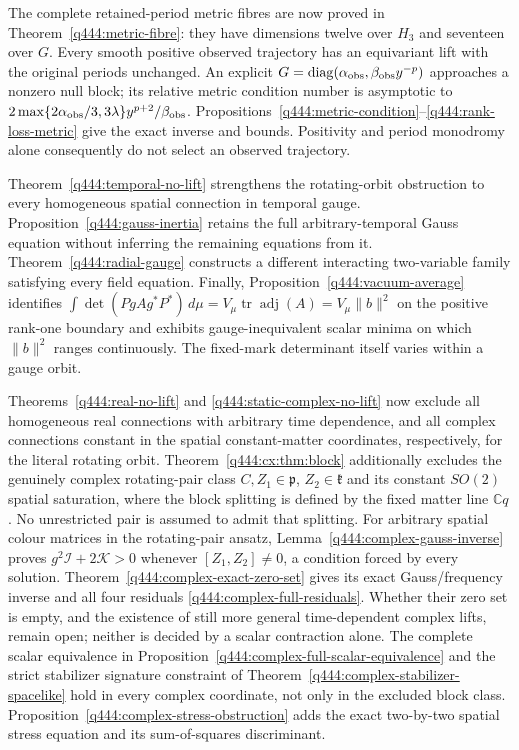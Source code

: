 The complete retained-period metric fibres are now proved in
Theorem~\ref{q444:metric-fibre}: they have dimensions twelve over $H_3$
and seventeen over $G$. Every smooth positive observed trajectory has
an equivariant lift with the original periods unchanged. An explicit
$G=\operatorname{diag}(\alpha_{\rm obs},\beta_{\rm obs}y^{-p})$
approaches a nonzero null block; its relative metric condition number
is asymptotic to
$2\max\{2\alpha_{\rm obs}/3,3\lambda\}y^{p+2}/\beta_{\rm obs}$.
Propositions~\ref{q444:metric-condition}--\ref{q444:rank-loss-metric}
give the exact inverse and bounds. Positivity and period monodromy
alone consequently do not select an observed trajectory.

Theorem~\ref{q444:temporal-no-lift} strengthens the rotating-orbit
obstruction to every homogeneous spatial connection in temporal gauge.
Proposition~\ref{q444:gauss-inertia} retains the full arbitrary-temporal
Gauss equation without inferring the remaining equations from it.
Theorem~\ref{q444:radial-gauge} constructs a different interacting
two-variable family satisfying every field equation.
Finally, Proposition~\ref{q444:vacuum-average} identifies
$\int\det(PgAg^*P^*)\,d\mu
=V_\mu\operatorname{tr}\operatorname{adj}(A)=V_\mu\|b\|^2$
on the positive rank-one boundary and exhibits gauge-inequivalent
scalar minima on which $\|b\|^2$ ranges continuously.
The fixed-mark determinant itself varies within a gauge orbit.

Theorems~\ref{q444:real-no-lift} and \ref{q444:static-complex-no-lift}
now exclude all homogeneous real connections with arbitrary time
dependence, and all complex connections constant in the spatial
constant-matter coordinates, respectively, for the literal rotating orbit.
Theorem~\ref{q444:cx:thm:block} additionally excludes the genuinely
complex rotating-pair class $C,Z_1\in\mathfrak p$, $Z_2\in\mathfrak k$
and its constant $SO(2)$ spatial saturation, where the block splitting
is defined by the fixed matter line $\mathbb Cq$. No unrestricted
pair is assumed to admit that splitting. For arbitrary spatial colour
matrices in the rotating-pair ansatz, Lemma~\ref{q444:complex-gauss-inverse}
proves $g^2\mathcal I+2\mathcal K>0$ whenever $[Z_1,Z_2]\ne0$, a
condition forced by every solution. Theorem~\ref{q444:complex-exact-zero-set}
gives its exact Gauss/frequency inverse and all four residuals
\eqref{q444:complex-full-residuals}. Whether their zero set is empty,
and the existence of still more general time-dependent complex lifts,
remain open; neither is decided by a scalar contraction alone.
The complete scalar equivalence in
Proposition~\ref{q444:complex-full-scalar-equivalence} and the
strict stabilizer signature constraint of
Theorem~\ref{q444:complex-stabilizer-spacelike} hold in every
complex coordinate, not only in the excluded block class.
Proposition~\ref{q444:complex-stress-obstruction} adds the exact
two-by-two spatial stress equation and its sum-of-squares discriminant.

